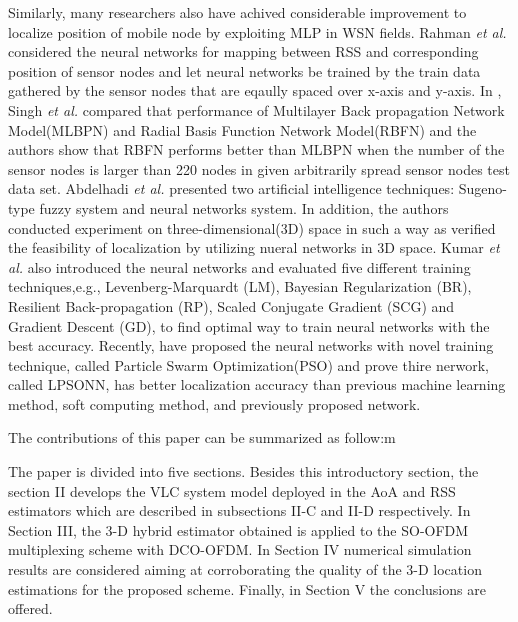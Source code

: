 \documentclass{ieeeaccess}
\begin{document}
Similarly, many researchers also have achived considerable improvement to localize position of mobile node by exploiting MLP\cite{rahman2009localization, singh2013tdoa,abdelhadi2013efficient, kumar2016localization, banihashemian2018new} in WSN fields. Rahman \textit{et al.} \cite{rahman2009localization} considered the neural networks for mapping between RSS and corresponding position of sensor nodes and let neural networks be trained by the train data gathered by the sensor nodes that are eqaully spaced over x-axis and y-axis. In \cite{singh2013tdoa}, Singh \textit{et al.} compared that performance of Multilayer Back propagation Network Model(MLBPN) and Radial Basis Function Network Model(RBFN) and the authors show that RBFN performs better than MLBPN when the number of the sensor nodes is larger than 220 nodes in given arbitrarily spread sensor nodes test data set. Abdelhadi \textit{et al.}  \cite{abdelhadi2013efficient} presented two artificial intelligence techniques: Sugeno-type fuzzy system and neural networks system. In addition, the authors conducted experiment on three-dimensional(3D) space in such a way as verified the feasibility of localization by utilizing nueral networks in 3D space. Kumar \textit{et al.} \cite{kumar2016localization} also introduced the neural networks and evaluated five different training techniques,e.g., Levenberg-Marquardt (LM), Bayesian Regularization
(BR), Resilient Back-propagation (RP), Scaled Conjugate Gradient (SCG) and Gradient
Descent (GD), to find optimal way to train neural networks with the best accuracy. Recently, \cite{banihashemian2018new} have proposed the neural networks with novel training technique, called Particle Swarm Optimization(PSO) and prove thire nerwork, called LPSONN, has better localization accuracy than previous machine learning method, soft computing method, and previously proposed network.

The contributions of this paper can be summarized as
follow:m

The paper is divided into five sections. Besides this introductory section, the section II develops the VLC system
model deployed in the AoA and RSS estimators which are
described in subsections II-C and II-D respectively. In Section III, the 3-D hybrid estimator obtained is applied to the
SO-OFDM multiplexing scheme with DCO-OFDM. In Section IV numerical simulation results are considered aiming at
corroborating the quality of the 3-D location estimations for
the proposed scheme. Finally, in Section V the conclusions
are offered.
\end{document}
